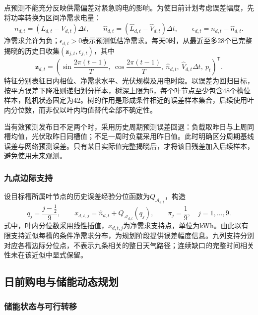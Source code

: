 点预测不能充分反映供需偏差对紧急购电的影响。为使日前计划考虑误差幅度，先将功率转换为区间净需求电量：
\begin{equation}\label{eq:q2-net-demand}
 n_{d,t}=(L_{d,t}-V_{d,t})\Delta t,\qquad
 \widehat n_{d,t}=(\widehat L_{d,t}-\widehat V_{d,t})\Delta t,
 \qquad \epsilon_{d,t}=n_{d,t}-\widehat n_{d,t}.
\end{equation}
净需求允许为负；$\epsilon_{d,t}>0$表示预测低估净需求。每天0时，从最近至多28个已完整揭晓的历史日收集$(\mathbf z_{j,t},\epsilon_{j,t})$，其中
\begin{equation}\label{eq:q2-tree-feature}
 \mathbf z_{d,t}=\left(
 \sin\frac{2\pi(t-1)}T,\ 
 \cos\frac{2\pi(t-1)}T,\ 
 \widehat n_{d,t},\ 
 \widehat V_{d,t}\Delta t,\ p_t
 \right)^{\mathsf T}.
\end{equation}
特征分别表征日内相位、净需求水平、光伏规模及用电时段。以误差为回归目标，按平方误差下降准则递归划分样本，树深上限为5，每个叶节点至少包含48个槽位样本，随机状态固定为42。树的作用是形成条件相近的误差样本集合，后续使用叶内分位数，而非仅以叶内均值替代全部不确定性。

当有效预测发布日不足两个时，采用历史周期预测误差回退：负载取昨日与上周同槽均值，光伏取昨日同槽值；不足一周时负载采用昨日值。此时明确区分周期基线误差与网络预测误差。只有某日实际值完整揭晓后，才将该日残差加入后续样本，避免使用未来观测。

\subsubsection{九点边际支持}

设目标槽所属叶节点的历史误差经验分位函数为$Q_{\mathcal A_{d,t}}$，构造
\begin{equation}\label{eq:q2-support}
 q_j=\frac{j-\tfrac12}{9},\qquad
 x_{d,t,j}=\widehat n_{d,t}+Q_{\mathcal A_{d,t}}(q_j),\qquad
 \pi_j=\frac19,\quad j=1,\ldots,9.
\end{equation}
式中，叶内分位数采用线性插值，$x_{d,t,j}$为净需求支持点，单位为kWh。由此以有限支持近似每槽的条件净需求分布，为规划阶段提供误差幅度信息。九列支持分别对应各槽边际分位点，不表示九条相关的整日天气路径；连续缺口的完整时间相关性未在该近似中显式保留。

\subsection{日前购电与储能动态规划}
\subsubsection{储能状态与可行转移}

